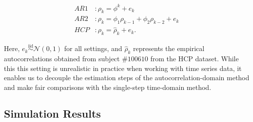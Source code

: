 \documentclass[latex/main.tex]{subfiles}
\begin{document}
\begin{align}
    \textit{AR1}&: \rho_k = \phi^k + e_k\\
    \textit{AR2}&: \rho_k = \phi_1\rho_{k-1} + \phi_2\rho_{k-2} + e_k\\
    \textit{HCP}&: \rho_k = \hat\rho_k + e_k.
\end{align}

\noindent Here, $e_k \overset{\text{iid}}{\sim} \mathcal{N}(0, 1)$ for all settings, and $\hat\rho_k$ represents the empirical autocorrelations obtained from subject $\#100610$ from the HCP dataset. While this this setting is unrealistic in practice when working with time series data, it enables us to decouple the estimation steps of the autocorrelation-domain method and make fair comparisons with the single-step time-domain method.

\subsection{Simulation Results}
\end{document}
